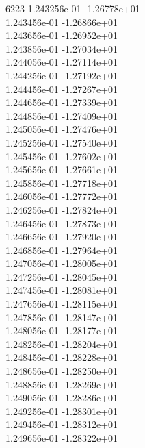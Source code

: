 6223	1.243256e-01	-1.26778e+01	\\ 	1.243456e-01	-1.26866e+01	\\ 	1.243656e-01	-1.26952e+01	\\ 	1.243856e-01	-1.27034e+01	\\ 	1.244056e-01	-1.27114e+01	\\ 	1.244256e-01	-1.27192e+01	\\ 	1.244456e-01	-1.27267e+01	\\ 	1.244656e-01	-1.27339e+01	\\ 	1.244856e-01	-1.27409e+01	\\ 	1.245056e-01	-1.27476e+01	\\ 	1.245256e-01	-1.27540e+01	\\ 	1.245456e-01	-1.27602e+01	\\ 	1.245656e-01	-1.27661e+01	\\ 	1.245856e-01	-1.27718e+01	\\ 	1.246056e-01	-1.27772e+01	\\ 	1.246256e-01	-1.27824e+01	\\ 	1.246456e-01	-1.27873e+01	\\ 	1.246656e-01	-1.27920e+01	\\ 	1.246856e-01	-1.27964e+01	\\ 	1.247056e-01	-1.28005e+01	\\ 	1.247256e-01	-1.28045e+01	\\ 	1.247456e-01	-1.28081e+01	\\ 	1.247656e-01	-1.28115e+01	\\ 	1.247856e-01	-1.28147e+01	\\ 	1.248056e-01	-1.28177e+01	\\ 	1.248256e-01	-1.28204e+01	\\ 	1.248456e-01	-1.28228e+01	\\ 	1.248656e-01	-1.28250e+01	\\ 	1.248856e-01	-1.28269e+01	\\ 	1.249056e-01	-1.28286e+01	\\ 	1.249256e-01	-1.28301e+01	\\ 	1.249456e-01	-1.28312e+01	\\ 	1.249656e-01	-1.28322e+01	\\ \hline
